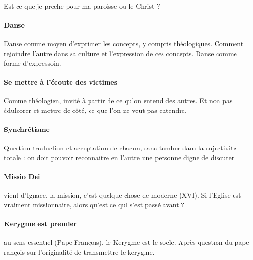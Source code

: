 Est-ce que je preche pour ma paroisse ou le Christ ?

\paragraph{Danse} Danse comme moyen d'exprimer les concepts, y compris théologiques. Comment rejoindre l'autre dans sa culture et l'expression de ces concepts. Danse comme forme d'expressoin. 

\paragraph{Se mettre à l'écoute des victimes} Comme théologien, invité à partir de ce qu'on entend des autres. Et non pas édulcorer et mettre de côté, ce que l'on ne veut pas entendre. 

\paragraph{Synchrétisme} Question traduction et acceptation de chacun, sans tomber dans la sujectivité totale : on doit pouvoir reconnaitre en l'autre une personne digne de discuter

\paragraph{Missio Dei} vient d'Ignace.
la mission, c'est quelque chose de moderne (XVI). Si l'Eglise est vraiment missionnaire, alors qu'est ce qui s'est passé avant ?

\paragraph{Kerygme est premier} au sens essentiel (Pape François), le Kerygme est le socle. Après question du pape rançois sur l'originalité de transmettre le kerygme.

